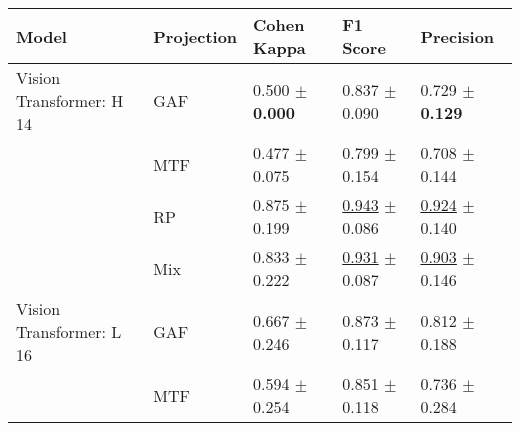 
\begin{tabular}{lllll}
\toprule
Model & Projection & Cohen Kappa & F1 Score & Precision \\
\midrule
Vision Transformer: H 14 & GAF & \textcolor[rgb]{0.9482758621,0.0517241379,0}{0.500} $\pm$ \textbf{\textcolor[rgb]{0.0000000000,0.5000000000,0}{0.000}} & \textcolor[rgb]{0.7551020408,0.2448979592,0}{0.837} $\pm$ \textcolor[rgb]{0.0917026964,0.5000000000,0}{0.090} & \textcolor[rgb]{0.9117647059,0.0882352941,0}{0.729} $\pm$ \textbf{\textcolor[rgb]{0.0000000000,0.5000000000,0}{0.129}} \\
 & MTF & \textcolor[rgb]{1.0000000000,0.0000000000,0}{0.477} $\pm$ \textcolor[rgb]{0.2928862697,0.5000000000,0}{0.075} & \textcolor[rgb]{1.0000000000,0.0000000000,0}{0.799} $\pm$ \textcolor[rgb]{1.0000000000,0.0000000000,0}{0.154} & \textcolor[rgb]{1.0000000000,0.0000000000,0}{0.708} $\pm$ \textcolor[rgb]{0.1005729181,0.5000000000,0}{0.144} \\
 & RP & \textcolor[rgb]{0.0948275862,0.5000000000,0}{0.875} $\pm$ \textcolor[rgb]{0.7749042320,0.2250957680,0}{0.199} & \underline{\textcolor[rgb]{0.0765306122,0.5000000000,0}{0.943}} $\pm$ \textcolor[rgb]{0.0436410935,0.5000000000,0}{0.086} & \underline{\textcolor[rgb]{0.0882352941,0.5000000000,0}{0.924}} $\pm$ \textcolor[rgb]{0.0707312682,0.5000000000,0}{0.140} \\
 & Mix & \textcolor[rgb]{0.1896551724,0.5000000000,0}{0.833} $\pm$ \textcolor[rgb]{0.8622338316,0.1377661684,0}{0.222} & \underline{\textcolor[rgb]{0.1530612245,0.5000000000,0}{0.931}} $\pm$ \textcolor[rgb]{0.0611600708,0.5000000000,0}{0.087} & \underline{\textcolor[rgb]{0.1764705882,0.5000000000,0}{0.903}} $\pm$ \textcolor[rgb]{0.1099220919,0.5000000000,0}{0.146} \\
Vision Transformer: L 16 & GAF & \textcolor[rgb]{0.5689655172,0.4310344828,0}{0.667} $\pm$ \textcolor[rgb]{0.9565625511,0.0434374489,0}{0.246} & \textcolor[rgb]{0.5255102041,0.4744897959,0}{0.873} $\pm$ \textcolor[rgb]{0.4802417507,0.5000000000,0}{0.117} & \textcolor[rgb]{0.5588235294,0.4411764706,0}{0.812} $\pm$ \textcolor[rgb]{0.3848316167,0.5000000000,0}{0.188} \\
 & MTF & \textcolor[rgb]{0.7344827586,0.2655172414,0}{0.594} $\pm$ \textcolor[rgb]{0.9873545177,0.0126454823,0}{0.254} & \textcolor[rgb]{0.6665120594,0.3334879406,0}{0.851} $\pm$ \textcolor[rgb]{0.4950603212,0.5000000000,0}{0.118} & \textcolor[rgb]{0.8823529412,0.1176470588,0}{0.736} $\pm$ \textcolor[rgb]{1.0000000000,0.0000000000,0}{0.284} \\

\end{tabular}
